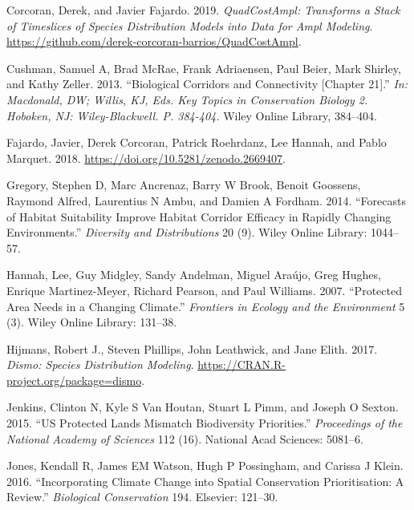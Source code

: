 \documentclass[]{article}
\begin{document}
\leavevmode\hypertarget{ref-Corcoran_Quadcost}{}%
Corcoran, Derek, and Javier Fajardo. 2019. \emph{QuadCostAmpl: Transforms a Stack of Timeslices of Species Distribution Models into Data for Ampl Modeling}. \url{https://github.com/derek-corcoran-barrios/QuadCostAmpl}.

\leavevmode\hypertarget{ref-cushman2013biological}{}%
Cushman, Samuel A, Brad McRae, Frank Adriaensen, Paul Beier, Mark Shirley, and Kathy Zeller. 2013. ``Biological Corridors and Connectivity {[}Chapter 21{]}.'' \emph{In: Macdonald, DW; Willis, KJ, Eds. Key Topics in Conservation Biology 2. Hoboken, NJ: Wiley-Blackwell. P. 384-404.} Wiley Online Library, 384--404.

\leavevmode\hypertarget{ref-fajardo_javier_2018_2669407}{}%
Fajardo, Javier, Derek Corcoran, Patrick Roehrdanz, Lee Hannah, and Pablo Marquet. 2018. \url{https://doi.org/10.5281/zenodo.2669407}.

\leavevmode\hypertarget{ref-gregory2014forecasts}{}%
Gregory, Stephen D, Marc Ancrenaz, Barry W Brook, Benoit Goossens, Raymond Alfred, Laurentius N Ambu, and Damien A Fordham. 2014. ``Forecasts of Habitat Suitability Improve Habitat Corridor Efficacy in Rapidly Changing Environments.'' \emph{Diversity and Distributions} 20 (9). Wiley Online Library: 1044--57.

\leavevmode\hypertarget{ref-hannah2007protected}{}%
Hannah, Lee, Guy Midgley, Sandy Andelman, Miguel Araújo, Greg Hughes, Enrique Martinez-Meyer, Richard Pearson, and Paul Williams. 2007. ``Protected Area Needs in a Changing Climate.'' \emph{Frontiers in Ecology and the Environment} 5 (3). Wiley Online Library: 131--38.

\leavevmode\hypertarget{ref-Hijmans_Dismo}{}%
Hijmans, Robert J., Steven Phillips, John Leathwick, and Jane Elith. 2017. \emph{Dismo: Species Distribution Modeling}. \url{https://CRAN.R-project.org/package=dismo}.

\leavevmode\hypertarget{ref-jenkins2015us}{}%
Jenkins, Clinton N, Kyle S Van Houtan, Stuart L Pimm, and Joseph O Sexton. 2015. ``US Protected Lands Mismatch Biodiversity Priorities.'' \emph{Proceedings of the National Academy of Sciences} 112 (16). National Acad Sciences: 5081--6.

\leavevmode\hypertarget{ref-jones2016incorporating}{}%
Jones, Kendall R, James EM Watson, Hugh P Possingham, and Carissa J Klein. 2016. ``Incorporating Climate Change into Spatial Conservation Prioritisation: A Review.'' \emph{Biological Conservation} 194. Elsevier: 121--30.
\end{document}
